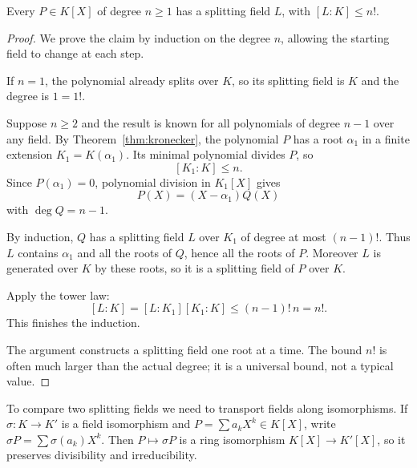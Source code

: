 \begin{proposition}\label{prop:splitexists}
Every $P\in K[X]$ of degree $n\ge1$ has a splitting field $L$, with $[L:K]\le n!$.
\end{proposition}
\begin{proof}
We prove the claim by induction on the
degree $n$, allowing the starting field
to change at each step.

If $n=1$, the polynomial already splits
over $K$, so its splitting field is $K$
and the degree is $1=1!$.

Suppose $n\ge2$ and the result is known
for all polynomials of degree $n-1$
over any field. By Theorem~\ref{thm:kronecker},
the polynomial $P$ has a root $\alpha_1$
in a finite extension $K_1=K(\alpha_1)$.
Its minimal polynomial divides $P$,
so
\[
[K_1:K]\le n.
\]
Since $P(\alpha_1)=0$, polynomial division
in $K_1[X]$ gives
\[
P(X)=(X-\alpha_1)Q(X)
\]
with $\deg Q=n-1$.

By induction, $Q$ has a splitting
field $L$ over $K_1$ of degree at
most $(n-1)!$. Thus $L$ contains
$\alpha_1$ and all the roots of $Q$,
hence all the roots of $P$.
Moreover $L$ is generated over $K$
by these roots, so it is a
splitting field of $P$ over $K$.

Apply the tower law:
\[
[L:K]=[L:K_1][K_1:K]
\le(n-1)!\,n=n!.
\]
This finishes the induction.

The argument constructs a splitting
field one root at a time. The bound
$n!$ is often much larger than the
actual degree; it is a universal bound,
not a typical value.
\end{proof}

To compare two splitting fields we need to transport fields along isomorphisms. If $\sigma:K\to K'$ is a field isomorphism and $P=\sum a_kX^k\in K[X]$, write $\sigma P=\sum\sigma(a_k)X^k$. Then $P\mapsto\sigma P$ is a ring isomorphism $K[X]\to K'[X]$, so it preserves divisibility and irreducibility.

